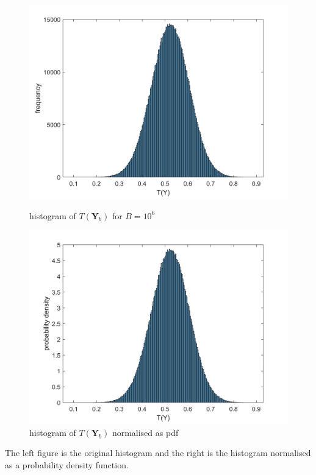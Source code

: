 \documentclass[10pt]{article}
\begin{document}
\begin{figure}[H]
    \begin{minipage}[b]{0.47\linewidth}
            \centering
            \includegraphics[width=\textwidth]{files/q2_histogram.png}
            \caption{histogram of $T(\mathbf{Y}_b)$ for $B=10^6$}
        \end{minipage}
        \hfill
        \begin{minipage}[b]{0.47\linewidth}
            \centering
            \includegraphics[width=\textwidth]{files/q2_pdf.png}
            \caption{histogram of $T(\mathbf{Y}_b)$ normalised as pdf}
        \end{minipage}
\end{figure}
\noindent The left figure is the original histogram and the right is the histogram normalised as a probability density function.\\
\end{document}
